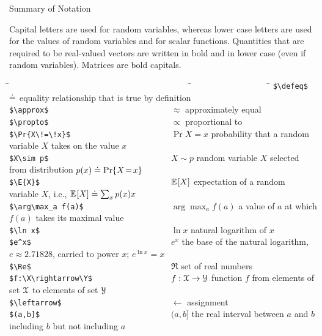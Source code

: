 \documentclass[10pt,fleqn]{article}
\begin{document}
\centerline{\Large Summary of Notation}

\bigskip\noindent
Capital letters are used for random variables, whereas lower case letters are used for the values of random variables and for scalar functions. Quantities that are required to be real-valued vectors are written in bold and in lower case (even if random variables). Matrices are bold capitals.
\begin{tabbing}
\=~~~~~~~~~~~~~~~~~~~~~~~~~~~~~~~~~~~~~~~~~~  \= ~~~~~~~~~~~~~~~~~  \= \kill
\>\verb+$\defeq$                             +\>$\doteq$            \> equality relationship that is true by definition\\
\>\verb+$\approx$                            +\>$\approx$           \> approximately equal\\
\>\verb+$\propto$                            +\>$\propto$           \> proportional to\\
\>\verb+$\Pr{X\!=\!x}$                       +\>$\Pr{X\!=\!x}$      \> probability that a random variable $X$ takes on the value $x$\\
\>\verb+$X\sim p$                            +\>$X\sim p$           \> random variable $X$ selected from distribution $p(x)\doteq{{\rm Pr\!}\left\{X\!=\!x\right\}}$\\
\>\verb+$\E{X}$                              +\>$\mathbb{E}_{\,\!\!}\left[X\right]$             \> expectation of a random variable $X$, i.e., $\mathbb{E}_{\,\!\!}\left[X\right]\doteq\sum_x p(x)x$\\
\>\verb+$\arg\max_a f(a)$                    +\>$\arg\max_a f(a)$   \> a value of $a$ at which $f(a)$ takes its maximal value\\
\>\verb+$\ln x$                              +\>$\ln x$             \> natural logarithm of $x$\\
\>\verb+$e^x$                                +\>$e^x$               \> the base of the natural logarithm, $e\approx 2.71828$, carried to power $x$; $e^{\ln x}=x$\\
\>\verb+$\Re$                                +\>$\Re$               \> set of real numbers\\
\>\verb+$f:\X\rightarrow\Y$                  +\>$f:{\cal X}\rightarrow{\cal Y}$ \> function $f$ from elements of set ${\cal X}$ to elements of set ${\cal Y}$\\
\>\verb+$\leftarrow$                         +\>$\leftarrow$        \> assignment\\
\>\verb+$(a,b]$                              +\>$(a,b]$             \> the real interval between $a$ and $b$ including $b$ but not including $a$\\

\end{tabbing}
\end{document}
